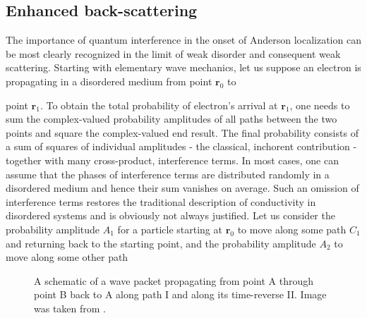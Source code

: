 \documentclass[10pt,a4paper]{article}
\begin{document}
\subsection{Enhanced back-scattering }
The importance of quantum interference in the onset of Anderson localization can be most clearly recognized in the limit of weak disorder and consequent weak scattering. Starting with elementary wave mechanics, let us suppose an electron is propagating in a disordered medium from point $\mathbf{r}_0$ to 
\begin{minipage}[t]{0.58\textwidth} 
point $\mathbf{r}_1$. To obtain the total probability of electron's arrival at $\mathbf{r}_1$, one needs to sum the complex-valued probability amplitudes of all paths between the two points and square the complex-valued end result. The final probability consists of a sum of squares of individual amplitudes - the classical, inchorent contribution - together with many cross-product, interference terms. In most cases, one can assume that the phases of interference terms are distributed randomly in a disordered medium and hence their sum vanishes on average. Such an omission of interference terms restores the traditional description of conductivity in disordered systems and is obviously not always justified. Let us consider the probability amplitude $A_1$ for a particle starting at $\mathbf{r}_0$ to move along some path $C_1$ and returning back to the starting point, and the probability amplitude $A_2$ to move along some other path
\end{minipage}\hfill
\begin{minipage}[t]{0.39\textwidth}
\begin{figure}[H]
\caption{A schematic of a wave packet propagating from point A through point B back to A along path I and along its time-reverse II. Image was taken from \cite{50yearsof}.}
\label{fig:paths} 
\end{figure}
\end{minipage}
\end{document}
